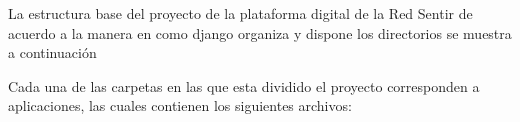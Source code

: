 \documentclass[journal,transmag]{IEEEtran}
\begin{document}
La estructura base del proyecto de la plataforma digital de la Red Sentir de acuerdo a la manera en como django organiza y dispone los directorios se muestra a continuación

\vspace{4mm}

Cada una de las carpetas en las que esta dividido el proyecto corresponden a aplicaciones, las cuales contienen los siguientes archivos:
\end{document}
